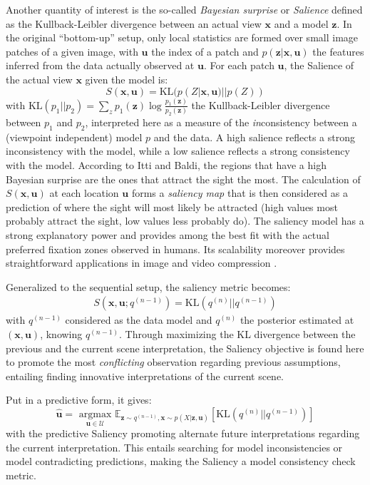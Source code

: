 \documentclass[12pt,twoside,openright]{article}
\begin{document}
Another quantity of interest is the so-called \emph{Bayesian surprise} or \emph{Salience} \citep{itti2005bayesian} defined as the Kullback-Leibler divergence  between an actual view $\boldsymbol{x}$ and a model $\boldsymbol{z}$. In the original ``bottom-up'' setup, only local statistics are formed over small image patches of a given image, with $\boldsymbol{u}$ the index of a patch and $p(\boldsymbol{z}|\boldsymbol{x},\boldsymbol{u})$ the features inferred from the data actually observed at $\boldsymbol{u}$. For each patch $\boldsymbol{u}$, the Salience of the actual view $\boldsymbol{x}$ given the model is:
$$ S(\boldsymbol{x},\boldsymbol{u}) = \text{KL}(p(Z| \boldsymbol{x}, \boldsymbol{u})||p(Z))$$
with $\text{KL}(p_1||p_2) = \sum_z p_1(\boldsymbol{z}) \log \frac{p_1(\boldsymbol{z})}{p_2(\boldsymbol{z})}$ the Kullback-Leibler divergence between $p_1$ and $p_2$, interpreted here as a measure of the \emph{in}consistency between a (viewpoint independent)  model $p$ and the data. A high salience reflects a strong inconsistency with the model, while a low salience reflects a strong consistency with the model. According to Itti and Baldi, the regions that have a high Bayesian surprise are the ones that attract the sight the most. The calculation of $S(\boldsymbol{x}, \boldsymbol{u})$ at each location $\boldsymbol{u}$ forms a \emph{saliency map} that is then considered as a prediction of where the sight will most likely be attracted (high values most probably attract the sight, low values less probably do). The saliency model has a strong explanatory power and provides among the best fit with the actual preferred fixation zones observed in humans.
Its scalability moreover provides straightforward applications in image and video compression  \citep{wang2003foveation,guo2010novel}.

Generalized to the sequential setup, the saliency metric becomes:
\begin{align} S(\boldsymbol{x},\boldsymbol{u}; q^{(n-1)}) = \text{KL}(q^{(n)}||q^{(n-1)})\label{eq:saliency}
\end{align}
with $q^{(n-1)}$ considered as the data model and $q^{(n)}$ the posterior estimated at $(\boldsymbol{x},\boldsymbol{u})$, knowing $q^{(n-1)}$. 
Through maximizing the KL divergence between the previous and the current scene interpretation, the Saliency objective is found here to promote the most \emph{conflicting} observation regarding previous assumptions, entailing finding innovative interpretations of the current scene.

Put in a predictive form, it gives:
$$ \hat{\boldsymbol{u}} = \underset{\boldsymbol{u} \in \mathcal{U}}{\text{ argmax }} \mathbb{E}_{\boldsymbol{z} \sim q^{(n-1)}, \boldsymbol{x} \sim p(X|\boldsymbol{z}, \boldsymbol{u})}\left[\text{KL}(q^{(n)}||q^{(n-1)})\right]$$
with the predictive Saliency promoting alternate future interpretations regarding the current interpretation. This entails searching for model inconsistencies or model contradicting predictions, making the Saliency a model consistency check metric.
\end{document}
